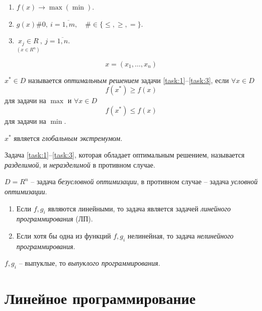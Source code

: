 \begin{note}\leavevmode
    \begin{enumerate}
        \item \label{task:1} $ f(x) \rightarrow \max(\min) $.
        \item \label{task:2} $ g(x) \# 0, \ i = \overline{1,m}, \quad \# \in \{\leqslant,\geqslant,=\} $.
        \item \label{task:3} $ \underset{(x\in R^n)}{x_j \in R}, \ j = \overline{1,n} $.
    \end{enumerate}
    \[
        x = (x_1,\ldots,x_n)
    \]
\end{note}

\begin{definition}
    $ x^* \in D $ называется \emph{оптимальным решением} задачи \ref{task:1}--\ref{task:3}, если $ \forall x \in D $
    \[
        f(x^*) \geqslant f(x)
    \]
    для задачи на $ \max $ и $ \forall x \in D $
    \[
        f(x^*) \leqslant f(x)
    \]
    для задачи на $ \min $.

    $ x^* $ является \emph{глобальным экстремумом}.
\end{definition}

\begin{definition}
    Задача \ref{task:1}--\ref{task:3}, которая обладает оптимальным решением, называется \emph{разделимой}, и \emph{неразделимой} в противном случае.

    $ D = R^n $ -- задача \emph{безусловной оптимизации}, в противном случае -- задача \emph{условной оптимизации}.
\end{definition}

\begin{note}[Классификация]\leavevmode
    \begin{enumerate}
        \item Если $ f,g_i $ являются линейными, то задача является задачей \emph{линейного программирования} (ЛП).
        \item Если хотя бы одна из функций $ f,g_i $ нелинейная, то задача \emph{нелинейного программирования}.
    \end{enumerate}
    $ f,g_i $ -- выпуклые, то \emph{выпуклого программирования}.
\end{note}

\chapter{Линейное программирование}


